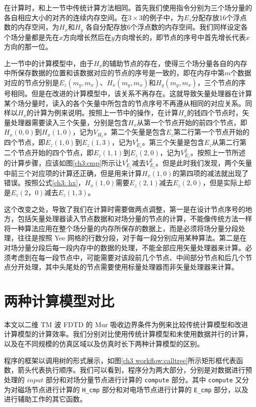 在计算时，和上一节中传统计算方法相同。首先我们使用指令分别为三个场分量的各自相应大小的对齐的连续内存空间。在$3\times3$的例子中，为$E_z$分配存放16个浮点数的内存空间，为$H_x$和$H_y$ 各自分配存放6个浮点数的内存空间。我们同样设定各个场分量都是先在$x$方向增长然后在$y$方向增长的，即节点的序号中首先增长代表$x$方向的那一位。

上一节中的计算模型中，由于$H_x$的辅助节点的存在，使得三个场分量各自的内存中所保存数据的位置和该数据对应的节点的序号是一致的，即在内存中第$m$个数据对应的节点分别是$E_z(m_y,m_x)$、$H_x(m_y,m_x)$和$H_y(m_y,m_x)$，三个节点的序号相同。但是在改进的计算模型中，该关系不再存在。这就导致矢量处理器在计算某个场分量时，读入的各个矢量中所包含的节点序号不再遵从相同的对应关系。同样以$H_x$的计算为例来说明。按照上一节中的操作，在计算$H_x$的钱四个节点时，矢量处理器需要读入三个矢量，分别是包含$H_x$从第一个节点开始的前四个节点，即$H_x(0,0)$到$H_x(1,0)$，记为$V_{H_x}$。第二个矢量是包含$E_z$第二行第一个节点开始的四个节点，即$E_z(1,0)$到$E_z(1,3)$，记为$V_{E_z}^1$。第三个矢量是包含$E_z$从第二行第二个节点开始的四个节点，即$E_z(1,1)$到$E_z(2,0)$，记为$V_{E_z}^2$。按照上一节所述的计算步骤，应该如图\ref{ch3:cmp}所示让$V_{E_z}^1$减去$V_{E_z}^2$。但是此时我们发现，两个矢量中前三个对应项的计算还正确，但是用来计算$H_x(1,0)$的第四项的减法就出现了错误。按照公式\eqref{ch3: hx}，$H_x(1,0)$需要$E_z(2,1)$减去$E_z(2,0)$，但是实际上却是$E_z(2，0)$减去$E_z(1,3)$。

这个改变之处，导致了我们在计算时需要做两点调整，第一是在设计节点序号的地方，包括矢量处理器读入节点数据和对场分量的节点的计算，不能像传统方法一样将一种算法应用在整个场分量的内存所保存的数据上，而是必须将场分量分段处理，往往是按照 Yee 网格的行数分段，对于每一段分别应用某种算法。第二是在对场分量分段后每一段内存中的数据的处理，不能全部应用矢量处理器来计算。必须考虑到在每一段节点中，可能需要对该段前几个节点、中间部分节点和后几个节点分开处理，其中头尾处的节点需要使用标量处理器而非矢量处理器来计算。

\section{两种计算模型对比}

本文以二维 TM 波 FDTD 的 Mur 吸收边界条件为例来比较传统计算模型和改进计算模型的计算效率。我们分别对比使用传统计算模型和未使用数据并行的计算，以及在不同规模的仿真区域以及仿真时长下两种计算模型的区别。

程序的框架以调用树的形式展示，如图\ref{ch3 workflow:calltree}所示矩形框代表函数，箭头代表执行顺序。我们可以看到，程序分为两大部分，分别是对数据进行预处理的 $input$ 部分和对场分量节点进行计算的 \lstinline|compute| 部分。其中 \lstinline|compute| 又分为对磁场节点进行计算的 \lstinline|H_cmp| 部分和对电场节点进行计算的 \lstinline|E_cmp| 部分，以及进行辅助工作的其它函数。

